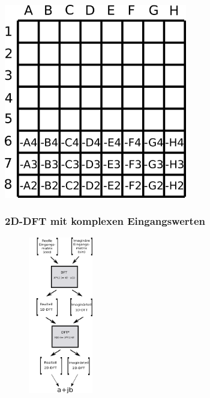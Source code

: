 \begin{frame}
\begin{minipage}{0.48\textwidth}
\begin{center}
 \vspace{0.5cm}
 \includegraphics[width=0.6\textwidth]{img/reelleMatMultRedundanzImagteil.png} 
\end{center}
\end{minipage}
\end{frame}
\restoreframe


\begin{frame}\frametitle{2D-DFT mit komplexen Eingangswerten}
 \begin{figure}[htbp]
 \centering
   \includegraphics[width=0.25\textwidth]{img/komplexeMatMult.png}
 \label{pic:komplexeDFT}
\end{figure}
\end{frame}



